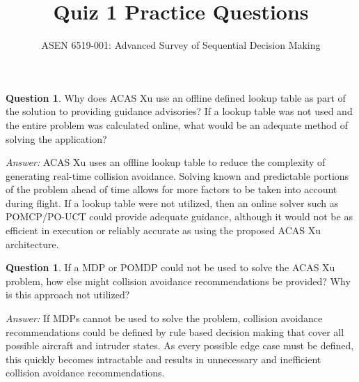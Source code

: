 \documentclass{article}
\title{Quiz 1 Practice Questions}
\author{ASEN 6519-001: Advanced Survey of Sequential Decision Making}
\theoremstyle{definition}
\newtheorem{question}[thm]{Question}
\newenvironment{answer}{\noindent\textit{Answer:}}{}
\begin{document}
\maketitle

\begin{question}
Why does ACAS Xu use an offline defined lookup table as part of the solution to providing guidance advisories? If a lookup table was not used and the entire problem was calculated online, what would be an adequate method of solving the application?
\end{question}

\begin{answer}
ACAS Xu uses an offline lookup table to reduce the complexity of generating real-time collision avoidance. Solving known and predictable portions of the problem ahead of time allows for more factors to be taken into account during flight. If a lookup table were not utilized, then an online solver such as POMCP/PO-UCT could provide adequate guidance, although it would not be as efficient in execution or reliably accurate as using the proposed ACAS Xu architecture.
\end{answer}

\begin{question}
If a MDP or POMDP could not be used to solve the ACAS Xu problem, how else might collision avoidance recommendations be provided? Why is this approach not utilized?
\end{question}

\begin{answer}
If MDPs cannot be used to solve the problem, collision avoidance recommendations could be defined by rule based decision making that cover all possible aircraft and intruder states. As every possible edge case must be defined, this quickly becomes intractable and results in unnecessary and inefficient collision avoidance recommendations.    
\end{answer}
\end{document}
